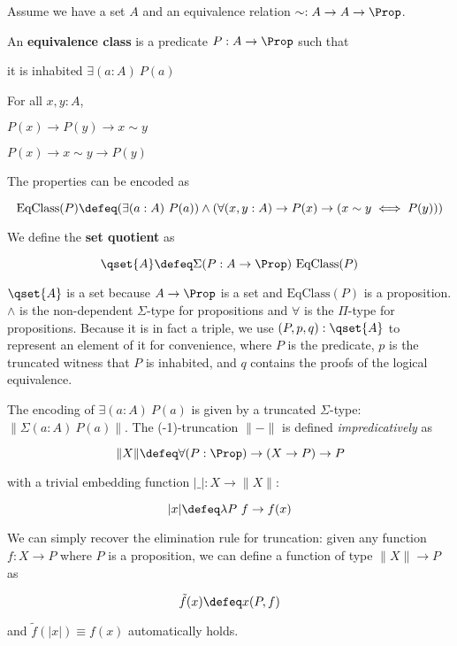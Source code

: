 Assume we have a set $A$ and an equivalence relation $\sim : A \to A \to \Prop$. 

\begin{definition}
An \textbf{equivalence class} is a predicate $P : A \to \Prop$ such that

it is inhabited $\exists (a : A) ~P (a)$

For all $x, y : A$,

$P(x) \to P(y) \to x \sim y$

$P(x) \to x \sim y \to P(y) $

The properties can be encoded as 

$$\text{EqClass}(P) \defeq (\exists (a : A) ~ P (a)) \wedge (\forall (x, y : A) \to P(x) \to (x \sim y \iff P(y)))$$
\end{definition}

\begin{definition}
We define the \textbf{set quotient} as

$$\qset{A} \defeq \Sigma (P : A \to \Prop) ~ \text{EqClass}(P)$$
\end{definition}

$\qset{A}$ is a set because $A \to \Prop$ is a set and $\text{EqClass}(P)$ is a proposition. $\wedge$ is the non-dependent $\Sigma$-type for propositions and $\forall$ is the $\Pi$-type for propositions.
Because it is in fact a triple, we use $(P,p,q) : \qset{A}$ to represent an element of it for convenience, 
where $P$ is the predicate, $p$ is the truncated witness that $P$ is inhabited, and $q$ contains the proofs of the logical equivalence.

 The encoding of $\exists(a : A)~ P(a)$ is given by a truncated $\Sigma$-type: $\| \Sigma(a : A)~P(a) \|$.
The (-1)-truncation $\|-\|$ is defined \emph{impredicatively} as

$$\|X\| \defeq \forall (P : \Prop) \to (X \to P) \to P$$

with a trivial embedding function $|\_| : X \to \| X \|$:

$$| x | \defeq \lambda P ~ f \to f(x)$$

We can simply recover the elimination rule for truncation: given any function $f : X \to P$ where $P$ is a proposition, we can define a function of type $\| X \| \to P$
as 

$$\tilde{f}(x) \defeq x(P,f)$$

and $\tilde{f}(|x|) \equiv f(x)$ automatically holds.

